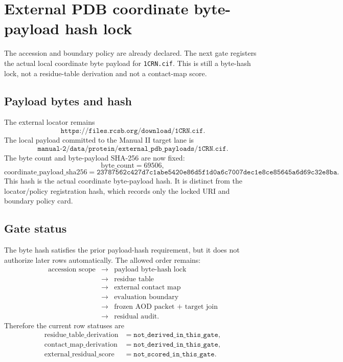 \section{External PDB coordinate byte-payload hash lock}

The accession and boundary policy are already declared. The next gate registers the actual local coordinate byte payload for \texttt{1CRN.cif}. This is still a byte-hash lock, not a residue-table derivation and not a contact-map score.

\subsection{Payload bytes and hash}

The external locator remains
\[
  \texttt{https://files.rcsb.org/download/1CRN.cif}.
\]
The local payload committed to the Manual II target lane is
\[
  \texttt{manual-2/data/protein/external\_pdb\_payloads/1CRN.cif}.
\]
The byte count and byte-payload SHA-256 are now fixed:
\[
  \mathrm{byte\_count}=69506,
\]
\[
  \mathrm{coordinate\_payload\_sha256}
  =\texttt{23787562c427d7c1abe5420e86d5f1d0a6c7007dec1e8ce85645a6d69c32e8ba}.
\]
This hash is the actual coordinate byte-payload hash. It is distinct from the locator/policy registration hash, which records only the locked URI and boundary policy card.

\subsection{Gate status}

The byte hash satisfies the prior payload-hash requirement, but it does not authorize later rows automatically. The allowed order remains:
\[
\begin{array}{rcl}
\text{accession scope} &\to& \text{payload byte-hash lock}\\
&\to& \text{residue table}\\
&\to& \text{external contact map}\\
&\to& \text{evaluation boundary}\\
&\to& \text{frozen AOD packet + target join}\\
&\to& \text{residual audit}.
\end{array}
\]
Therefore the current row statuses are
\[
\begin{aligned}
  \mathrm{residue\_table\_derivation}&=\texttt{not\_derived\_in\_this\_gate},\\
  \mathrm{contact\_map\_derivation}&=\texttt{not\_derived\_in\_this\_gate},\\
  \mathrm{external\_residual\_score}&=\texttt{not\_scored\_in\_this\_gate}.
\end{aligned}
\]

